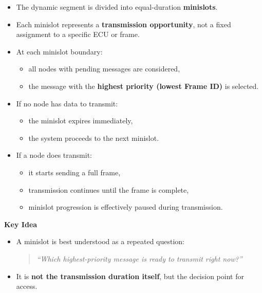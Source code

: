 \begin{itemize}
    \item The dynamic segment is divided into equal-duration
    \textbf{minislots}.
    
    \item Each minislot represents a \textbf{transmission opportunity}, not a fixed assignment to a specific ECU or frame.
    
    \item At each minislot boundary:
    \begin{itemize}
        \item all nodes with pending messages are considered,
        \item the message with the \textbf{highest priority (lowest Frame ID)} is selected.
    \end{itemize}
    
    \item If no node has data to transmit:
    \begin{itemize}
        \item the minislot expires immediately,
        \item the system proceeds to the next minislot.
    \end{itemize}
    
    \item If a node does transmit:
    \begin{itemize}
        \item it starts sending a full frame,
        \item transmission continues until the frame is complete,
        \item minislot progression is effectively paused during transmission.
    \end{itemize}
\end{itemize}
\begin{mdframed}[backgroundcolor=lightgray, linewidth=0pt, innertopmargin=8pt,
innerbottommargin=8pt]
\textbf{Key Idea}
\begin{itemize}
    \item A minislot is best understood as a repeated question:
    
    \begin{quote}
    \textit{“Which highest-priority message is ready to transmit right now?”}
    \end{quote}
    
    \item It is \textbf{not the transmission duration itself}, but the decision point for access.
\end{itemize}
\end{mdframed}
